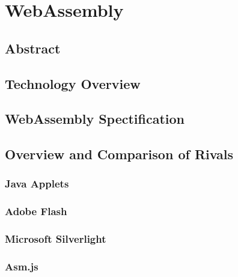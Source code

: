 \chapter{WebAssembly}

\section{Abstract}
\subsection{}
\subsection{}

\section{Technology Overview}
\subsection{}
\subsection{}

\section{WebAssembly Spectification}
\subsection{}
\subsection{}

\section{Overview and Comparison of Rivals}
\subsection{Java Applets}
\subsection{Adobe Flash}
\subsection{Microsoft Silverlight}
\subsection{Asm.js}
